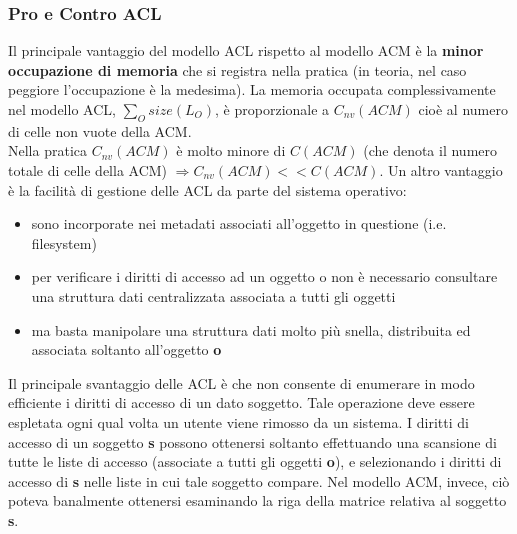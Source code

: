 \subsubsection{Pro e Contro ACL}
Il principale vantaggio del modello ACL rispetto al modello ACM è la \textbf{minor occupazione di memoria} che si registra nella pratica (in teoria, nel caso peggiore l'occupazione è la medesima). La memoria occupata complessivamente nel modello ACL, $\sum_{O} size(L_{O})$, è proporzionale a $C_{nv} (ACM)$ cioè al numero di celle non vuote della ACM. \\

Nella pratica $C_{nv} (ACM)$ è molto minore di $C (ACM)$ (che denota il numero totale di celle della ACM) $\Rightarrow C_{nv} (ACM)<<C (ACM)$. Un altro vantaggio è la facilità di gestione delle ACL da parte del sistema operativo:
\begin{itemize} 
  \item sono incorporate nei metadati associati all’oggetto in questione (i.e. filesystem)
  \item per verificare i diritti di accesso ad un oggetto o non è necessario consultare una struttura dati centralizzata associata a tutti gli oggetti
  \item ma basta manipolare una struttura dati molto più snella, distribuita ed associata soltanto all'oggetto \textbf{o}
\end{itemize}

Il principale svantaggio delle ACL è che non consente di enumerare in modo efficiente i diritti di accesso di un dato soggetto. Tale operazione deve essere espletata ogni qual volta un utente viene rimosso da un sistema. I diritti di accesso di un soggetto \textbf{s} possono ottenersi soltanto effettuando una scansione di tutte le liste di accesso (associate a tutti gli oggetti \textbf{o}), e selezionando i diritti di accesso di \textbf{s} nelle liste in cui tale soggetto compare. Nel modello ACM, invece, ciò poteva banalmente ottenersi esaminando la riga della matrice relativa al soggetto \textbf{s}.


